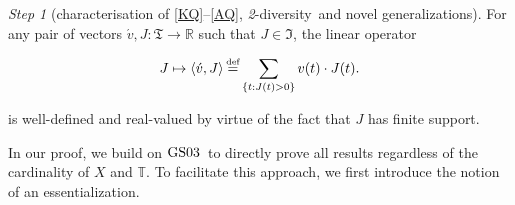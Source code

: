 \documentclass[ecta,nameyear,draft]{econsocart}
\newcommand{\countof}{\mathbin{\#}\hskip1pt}
\newcommand{\R}{\mathbb R}
\newcommand\defeq{\mathrel{\overset{\makebox[0pt]{\mbox{\normalfont\tiny def}}}{=}}}%
\newcommand{\mbbt}{{\mathds {T}}}
\newcommand{\mbbtpp}{{\mathfrak{T}}}
\newcommand{\mbbjpp}{\mathfrak{I}}
\newcommand{\twodiv}{\textit{2}-\textup{diversity}}
\newcommand{\gsii}{$\textup{GS03}$}
\theoremstyle{plain}
\theoremstyle{remark}
\newtheorem{step}{Step}[section]
\begin{document}
\begin{appendix}
    \begin{step}[characterisation of \ref{KQ}–\ref{AQ}, \twodiv\ and novel
      generalizations]\label{step-twodiv}
    For any pair of vectors $\acute v, J: \mbbtpp \rightarrow \R$ such that $J
    \in \mbbjpp$, the linear operator
    \begin{linenomath*}
      \begin{equation*}
        J \mapsto \langle \acute v, J \rangle \defeq \sum_{\{t : J(t) > 0\}} v(t)
        \cdot J(t).
      \end{equation*}
    \end{linenomath*}
    is well-defined and real-valued by virtue of the fact that $J$ has finite
    support.

    In our proof, we build on \gsii\ to directly prove all results regardless of
    the cardinality of $X$ and $\mbbt$. To facilitate this approach, we first 
    introduce the notion of an essentialization.


\end{step}
\end{appendix}
\end{document}
